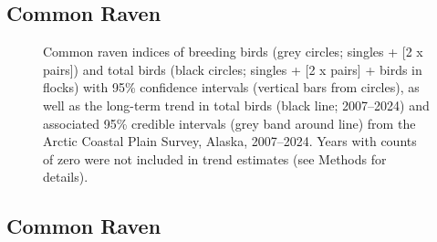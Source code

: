\documentclass[
]{article}
\begin{document}
\newpage{}

\subsection*{Common Raven}\label{common-raven}

\begin{figure}


\caption{\label{fig-CORA}Common raven indices of breeding birds (grey
circles; singles + {[}2 x pairs{]}) and total birds (black circles;
singles + {[}2 x pairs{]} + birds in flocks) with 95\% confidence
intervals (vertical bars from circles), as well as the long-term trend
in total birds (black line; 2007--2024) and associated 95\% credible
intervals (grey band around line) from the Arctic Coastal Plain Survey,
Alaska, 2007--2024. Years with counts of zero were not included in trend
estimates (see Methods for details).}

\end{figure}%

\newpage{}

\subsection*{Common Raven}\label{common-raven-1}

\begingroup\fontsize{10}{12}\selectfont
\end{document}
